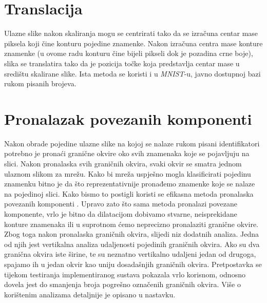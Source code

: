 \documentclass[times, utf8, diplomski]{fer}
\theoremstyle{definition}
\begin{document}
\section{Translacija}
Ulazne slike nakon skaliranja mogu se centrirati tako da se izračuna centar mase piksela koji čine konturu pojedine znamenke. Nakon izračuna centra mase konture znamenke (u ovome radu konturu čine bijeli pikseli dok je pozadina crne boje), slika se translatira tako da je pozicija točke koja predstavlja centar mase u središtu skalirane slike. Ista metoda se koristi i u \textit{MNIST}-u, javno dostupnoj bazi rukom pisanih brojeva.
\section{Pronalazak povezanih komponenti}
Nakon obrade pojedine ulazne slike na kojoj se nalaze rukom pisani identifikatori potrebno je pronaći granične okvire oko svih znamenaka koje se pojavljuju na slici. Nakon pronalaska svih graničnih okvira, svaki okvir se smatra jednom ulaznom slikom za mrežu. Kako bi mreža uspješno mogla klasificirati pojedinu znamenku bitno je da što reprezentativnije pronađemo znamenke koje se nalaze na pojedinoj slici. Kako bismo to postigli koristi se efikasna metoda pronalaska povezanih komponenti . Upravo zato što sama metoda pronalazi povezane komponente, vrlo je bitno da dilatacijom dobivamo stvarne, neisprekidane konture znamenaka ili u suprotnom ćemo neprecizno pronalaziti granične okvire. Zbog toga nakon pronalaska graničnih okvira, slijedi niz dodatnih analiza. Jedna od njih jest  vertikalna analiza udaljenosti pojedinih graničnih okvira. Ako su dva granična okvira iste širine, te su neznatno vertikalno udaljeni jedan od drugoga, spajamo ih u jedan okvir kao uniju dosadašnjih graničnih okvira. Pretpostavka se tijekom testiranja implementiranog sustava pokazala vrlo korisnom, odnosno dovela jest do smanjenja broja pogrešno označenih graničnih okvira. Više o korištenim analizama detaljnije je opisano u nastavku. \newline\newline
\end{document}
